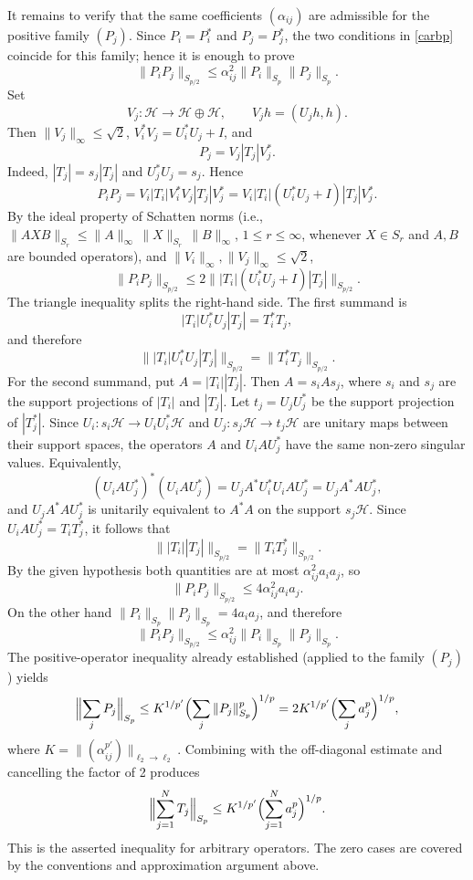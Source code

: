\documentclass[10pt,a4paper]{amsart}
\newcommand{\1}{\mathbf{1}}
\begin{document}
It remains to verify that the same coefficients $(\alpha_{ij})$ are admissible
for the positive family $(P_j)$. Since $P_i=P_i^*$ and $P_j=P_j^*$, the two
conditions in \eqref{carbp} coincide for this family; hence it is enough to
prove
\[
\|P_iP_j\|_{S_{p/2}}
\le
\alpha_{ij}^2\|P_i\|_{S_p}\|P_j\|_{S_p}.
\]
Set
\[
V_j:\mathcal H\to\mathcal H\oplus\mathcal H,\qquad V_jh=(U_jh,h).
\]
Then $\|V_j\|_\infty\le \sqrt2$, $V_i^*V_j=U_i^*U_j+I$, and
\[
P_j=V_j|T_j|V_j^*.
\]
Indeed, $|T_j|=s_j|T_j|$ and $U_j^*U_j=s_j$. Hence
\[
P_iP_j
=
V_i|T_i|V_i^*V_j|T_j|V_j^*
=
V_i|T_i|(U_i^*U_j+I)|T_j|V_j^*.
\]
By the ideal property of Schatten norms (i.e., $\|AXB\|_{S_r}
\le
\|A\|_{\infty}\,\|X\|_{S_r}\,\|B\|_{\infty}$, $1\le r\le \infty$, 
whenever \(X\in S_r\) and \(A,B\) are bounded operators),  and $\|V_i\|_\infty,\|V_j\|_\infty\le
\sqrt2$,
\[
\|P_iP_j\|_{S_{p/2}}
\le
2\bigl\||T_i|(U_i^*U_j+I)|T_j|\bigr\|_{S_{p/2}}.
\]
The triangle inequality splits the right-hand side. The first summand is
\[
|T_i|U_i^*U_j|T_j|=T_i^*T_j,
\]
and therefore
\[
\bigl\||T_i|U_i^*U_j|T_j|\bigr\|_{S_{p/2}}
=
\|T_i^*T_j\|_{S_{p/2}}.
\]
For the second summand, put $A=|T_i||T_j|$. Then
$A=s_iAs_j$, where $s_i$ and $s_j$ are the support projections of $|T_i|$
and $|T_j|$. Let $t_j=U_jU_j^*$ be the support projection of $|T_j^*|$. Since
$U_i:s_i\mathcal H\to U_iU_i^*\mathcal H$ and
$U_j:s_j\mathcal H\to t_j\mathcal H$ are unitary maps between their support
spaces, the operators $A$ and $U_iAU_j^*$ have the same non-zero singular
values. Equivalently,
\[
(U_iAU_j^*)^*(U_iAU_j^*)
=
U_jA^*U_i^*U_iAU_j^*
=
U_jA^*AU_j^*,
\]
and $U_jA^*AU_j^*$ is unitarily equivalent to $A^*A$ on the support $s_j\mathcal
H$. Since $U_iAU_j^*=T_iT_j^*$, it follows that
\[
\bigl\||T_i||T_j|\bigr\|_{S_{p/2}}
=
\|T_iT_j^*\|_{S_{p/2}}.
\]
By the given hypothesis both quantities are at most $\alpha_{ij}^2 a_i a_j$, so
\[
\|P_i P_j\|_{S_{p/2}}\leq 4\alpha_{ij}^2 a_i a_j.
\]
On the other hand $\|P_i\|_{S_p}\|P_j\|_{S_p}=4a_i a_j$, and therefore
\[
\|P_i P_j\|_{S_{p/2}}\leq\alpha_{ij}^2\|P_i\|_{S_p}\|P_j\|_{S_p}.
\]
The positive-operator inequality already established (applied to the family $(P_j)$) yields
\[
\Bigl\|\sum_j P_j\Bigr\|_{S_p}\leq K^{1/p'}\Bigl(\sum_j\|P_j\|_{S_p}^p\Bigr)^{1/p}=2K^{1/p'}\Bigl(\sum_j a_j^p\Bigr)^{1/p},
\]
where $K=\|(\alpha_{ij}^{p'})\|_{\ell_2\to\ell_2}$. Combining with the off-diagonal estimate and cancelling the factor of 2 produces
\[
\Bigl\|\sum_{j=1}^N T_j\Bigr\|_{S_p}\leq K^{1/p'}\Bigl(\sum_{j=1}^N a_j^p\Bigr)^{1/p}.
\]
This is the asserted inequality for arbitrary operators. The zero cases are covered by the conventions and approximation argument above.
\end{document}

